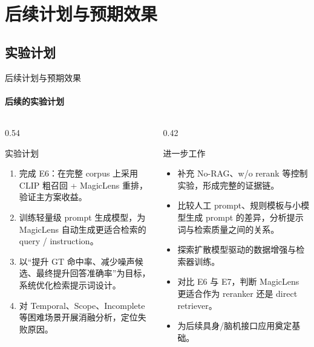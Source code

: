 \documentclass[10pt,aspectratio=169,]{beamer}
\begin{document}
\section{后续计划与预期效果}
\subsection{实验计划}
\begin{frame}{后续计划与预期效果}
	\framesubtitle{后续的实验计划}
	\begin{columns}[T]
		\begin{column}{0.54\textwidth}
			\begin{block}{实验计划}
				\begin{enumerate}
					\item 完成 E6：在完整 corpus 上采用 CLIP 粗召回 + MagicLens 重排，验证主方案收益。
					\item 训练轻量级 prompt 生成模型，为 MagicLens 自动生成更适合检索的 query / instruction。
					\item 以“提升 GT 命中率、减少噪声候选、最终提升回答准确率”为目标，系统优化检索提示词设计。
					\item 对 Temporal、Scope、Incomplete 等困难场景开展消融分析，定位失败原因。
				\end{enumerate}
			\end{block}
		\end{column}
		\begin{column}{0.42\textwidth}
			\begin{alertblock}{进一步工作}
				\begin{itemize}
					\item 补充 No-RAG、w/o rerank 等控制实验，形成完整的证据链。
					\item 比较人工 prompt、规则模板与小模型生成 prompt 的差异，分析提示词与检索质量之间的关系。
					\item 探索扩散模型驱动的数据增强与检索器训练。
					\item 对比 E6 与 E7，判断 MagicLens 更适合作为 reranker 还是 direct retriever。
					\item 为后续具身/脑机接口应用奠定基础。
				\end{itemize}
			\end{alertblock}
		\end{column}
	\end{columns}
\end{frame}
\end{document}
